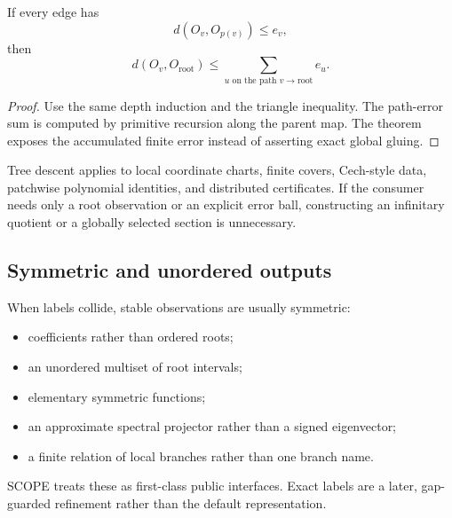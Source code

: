 \begin{theorem}
If every edge has
\[
  d(O_v,O_{p(v)})\le e_v,
\]
then
\[
  d(O_v,O_{\mathrm{root}})\le
  \sum_{u\text{ on the path }v\to\mathrm{root}}e_u.
\]
\end{theorem}
\begin{proof}
Use the same depth induction and the triangle inequality.  The path-error sum is computed by primitive recursion along the parent map.  The theorem exposes the accumulated finite error instead of asserting exact global gluing.
\end{proof}

Tree descent applies to local coordinate charts, finite covers, Cech-style data, patchwise polynomial identities, and distributed certificates.  If the consumer needs only a root observation or an explicit error ball, constructing an infinitary quotient or a globally selected section is unnecessary.

\subsection{Symmetric and unordered outputs}

When labels collide, stable observations are usually symmetric:

\begin{itemize}
\item coefficients rather than ordered roots;
\item an unordered multiset of root intervals;
\item elementary symmetric functions;
\item an approximate spectral projector rather than a signed eigenvector;
\item a finite relation of local branches rather than one branch name.
\end{itemize}

SCOPE treats these as first-class public interfaces.  Exact labels are a later, gap-guarded refinement rather than the default representation.
